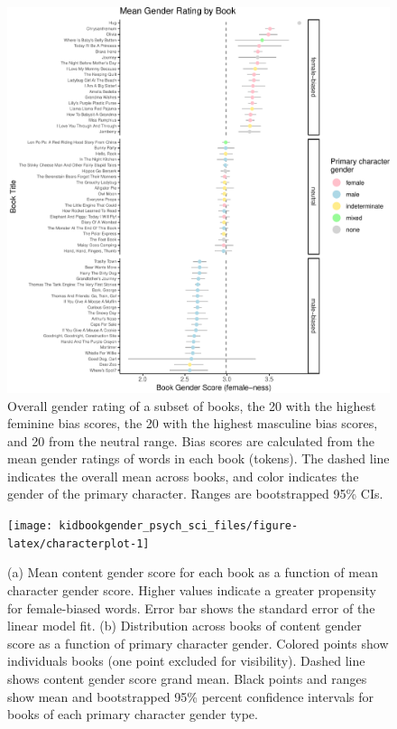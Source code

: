 \documentclass[
  english,
  ,man,floatsintext]{apa6}
\begin{document}
\begin{figure}[b]
\includegraphics{kidbookgender_psych_sci_files/figure-latex/bookforest-1} \caption{Overall gender rating of  a subset of books, the 20 with the highest feminine bias scores, the 20 with the highest masculine bias scores, and 20 from the neutral range. Bias scores are calculated from the mean gender ratings of words in each book (tokens). The dashed line indicates the overall mean across books, and color indicates the gender of the primary character. Ranges are bootstrapped 95\% CIs.}\label{fig:bookforest}
\end{figure}

\begin{figure}[t!]
\texttt{[image: kidbookgender\_psych\_sci\_files/figure-latex/characterplot-1]} \caption{(a) Mean content gender score for each book as a function of mean character gender score. Higher values indicate a greater propensity for female-biased words. Error bar shows the standard error of the linear model fit. (b) Distribution across books of content gender score as a function of primary character gender. Colored points show individuals books (one point excluded for visibility). Dashed line shows content gender score grand mean. Black points and ranges show mean and bootstrapped 95\% percent confidence intervals for books of each primary character gender type.}\label{fig:characterplot}
\end{figure}
\end{document}
